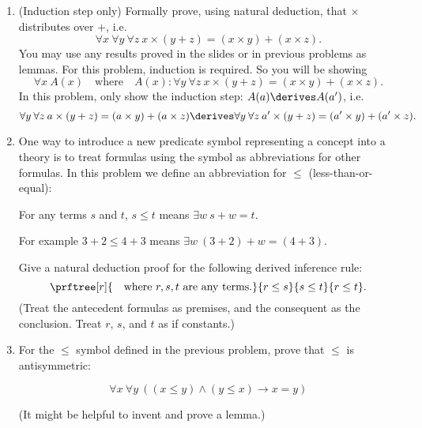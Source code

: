 \documentclass{cs81-homework}
\begin{document}
\begin{enumerate}
  \begin{solution}
  \end{solution}

\item {} (Induction step only) Formally prove, using natural deduction,
  that \(\times\) distributes over \(+\), i.e.
  \[
    \forall x \: \forall y \: \forall z \: x \times (y + z) = (x \times y) + (x \times z).
  \]
  You may use any results proved in the slides or in previous problems as lemmas.
  For this problem, induction is required.  So you will be showing
  \[
    \forall x \: A(x) \quad \text{where} \quad A(x)\colon \forall y \: \forall z
    \: x \times (y + z) = (x \times y) + (x \times z).
  \]
  In this problem, only show the induction step: \(A(a) \derives A(a')\), i.e.
  \[
    \forall y \: \forall z \: a \times (y + z) = (a \times y) + (a \times z)
    \derives \forall y \: \forall z \: a' \times (y + z) = (a' \times y) + (a'
    \times z).
  \]

  \begin{solution}
  \end{solution}

\item {} One way to introduce a new predicate symbol representing a
  concept into a theory is to treat formulas using the symbol as abbreviations
  for other formulas.  In this problem we define an abbreviation for \(\le\)
  (less-than-or-equal):
  
  For any terms \(s\) and \(t\), \(s \le t\) means \(\exists w \: s+w = t\).
  
  For example \(3+2 \le 4+3\) means \(\exists w \: (3+2)+w = (4+3)\).
        
  Give a natural deduction proof for the following derived inference rule:
  \[
    \prftree[r]{\quad\text{where \(r, s, t\) are any terms.}}{r \le s}{s \le
      t}{r \le t}.
  \]
  (Treat the antecedent formulas as premises, and the consequent as the
  conclusion. Treat \(r\), \(s\), and \(t\) as if constants.)

  \begin{solution}
  \end{solution}

\item {} For the \(\le\) symbol defined in the previous problem, prove
  that \(\le\) is antisymmetric:

  \[
    \forall x \: \forall y \: ((x \le y) \land (y \le x) \to x = y)
  \]

  (It might be helpful to invent and prove a lemma.)
  
  \begin{solution}
  \end{solution}

\end{enumerate}
\end{document}
